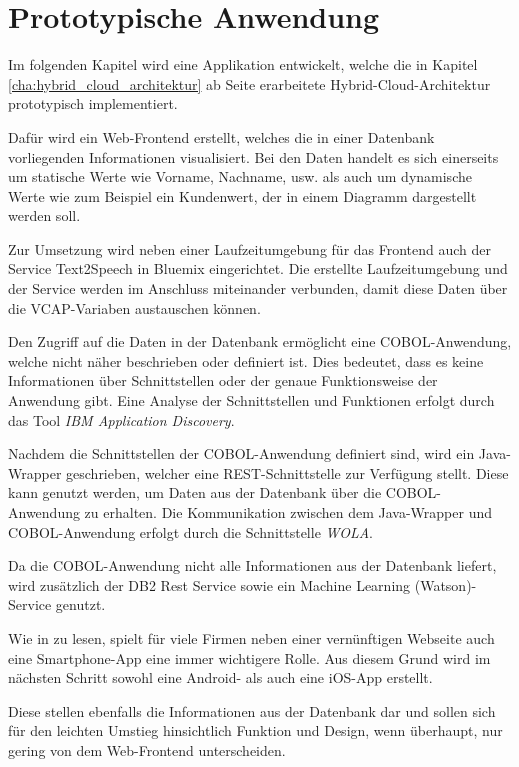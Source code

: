 \chapter{Prototypische Anwendung}
\label{cha:prototypische_anwendung}

Im folgenden Kapitel wird eine Applikation entwickelt, welche die in Kapitel \ref{cha:hybrid_cloud_architektur} ab Seite
\pageref{cha:hybrid_cloud_architektur} erarbeitete Hybrid-Cloud-Architektur prototypisch implementiert.

Dafür wird ein Web-Frontend erstellt, welches die in einer Datenbank vorliegenden Informationen visualisiert. Bei den
Daten handelt es sich einerseits um statische Werte wie Vorname, Nachname, usw. als auch um dynamische Werte wie zum
Beispiel ein Kundenwert, der in einem Diagramm dargestellt werden soll.

Zur Umsetzung wird neben einer Laufzeitumgebung für das Frontend auch der Service Text\-2Speech in Bluemix eingerichtet.
Die erstellte Laufzeitumgebung und der Service werden im Anschluss miteinander verbunden, damit diese Daten über die
VCAP-Variaben austauschen können.

Den Zugriff auf die Daten in der Datenbank ermöglicht eine COBOL-Anwendung, welche nicht näher beschrieben oder definiert
ist. Dies bedeutet, dass es keine Informationen über Schnittstellen oder der genaue Funktionsweise der Anwendung gibt.
Eine Analyse der Schnittstellen und Funktionen erfolgt durch das Tool \textit{IBM Application Discovery}.

Nachdem die Schnittstellen der COBOL-Anwendung definiert sind, wird ein Java-Wrapper geschrieben, welcher eine
REST-Schnittstelle zur Verfügung stellt. Diese kann genutzt werden, um Daten aus der Datenbank über die COBOL-Anwendung
zu erhalten. Die Kommunikation zwischen dem Java-Wrapper und COBOL-Anwendung erfolgt durch die Schnittstelle \textit{WOLA}.

Da die COBOL-Anwendung nicht alle Informationen aus der Datenbank liefert, wird zusätzlich der DB2 Rest Service sowie ein
Machine Learning (Watson)-Service genutzt.

Wie in \cite{online_einleitung_app} zu lesen, spielt für viele Firmen neben einer vernünftigen Webseite auch eine
Smartphone-App eine immer wichtigere Rolle. Aus diesem Grund wird im nächsten Schritt sowohl eine Android- als auch eine
iOS-App erstellt.

Diese stellen ebenfalls die Informationen aus der Datenbank dar und sollen sich für den leichten Umstieg hinsichtlich
Funktion und Design, wenn überhaupt, nur gering von dem Web-Frontend unterscheiden.

